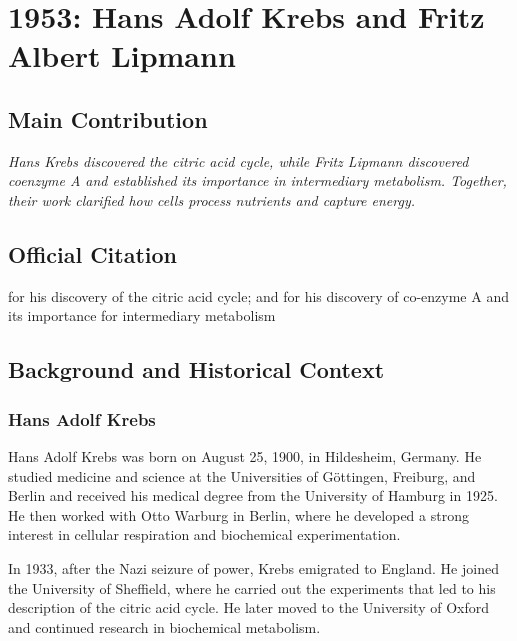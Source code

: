 \chapter[1953 --- Krebs and Lipmann]{1953: Hans Adolf Krebs and Fritz Albert Lipmann}
\label{ch:1953_krebs_lipmann}

\section*{Main Contribution}

\textit{Hans Krebs discovered the citric acid cycle, while Fritz Lipmann discovered coenzyme A and established its importance in intermediary metabolism. Together, their work clarified how cells process nutrients and capture energy.}\cite{nobel-1953,lecture-krebs-1953,lecture-lipmann-1953}

\section{Official Citation}

for his discovery of the citric acid cycle; and for his discovery of co-enzyme A and its importance for intermediary metabolism

\section{Background and Historical Context}

\subsection{Hans Adolf Krebs}

Hans Adolf Krebs was born on August 25, 1900, in Hildesheim, Germany. He studied medicine and science at the Universities of G\"ottingen, Freiburg, and Berlin and received his medical degree from the University of Hamburg in 1925. He then worked with Otto Warburg in Berlin, where he developed a strong interest in cellular respiration and biochemical experimentation.

In 1933, after the Nazi seizure of power, Krebs emigrated to England. He joined the University of Sheffield, where he carried out the experiments that led to his description of the citric acid cycle. He later moved to the University of Oxford and continued research in biochemical metabolism.

